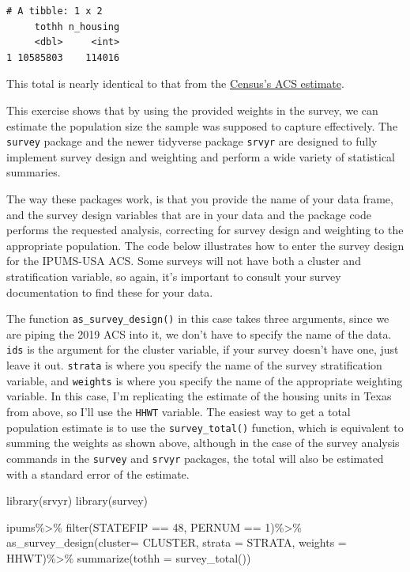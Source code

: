 \documentclass[
  letterpaper,
  DIV=11,
  numbers=noendperiod]{scrreprt}
\newenvironment{Shaded}{\begin{snugshade}}{\end{snugshade}}
\newcommand{\AttributeTok}[1]{\textcolor[rgb]{0.40,0.45,0.13}{#1}}
\newcommand{\DecValTok}[1]{\textcolor[rgb]{0.68,0.00,0.00}{#1}}
\newcommand{\FunctionTok}[1]{\textcolor[rgb]{0.28,0.35,0.67}{#1}}
\newcommand{\NormalTok}[1]{\textcolor[rgb]{0.00,0.23,0.31}{#1}}
\newcommand{\SpecialCharTok}[1]{\textcolor[rgb]{0.37,0.37,0.37}{#1}}
\begin{document}
\begin{verbatim}
# A tibble: 1 x 2
     tothh n_housing
     <dbl>     <int>
1 10585803    114016
\end{verbatim}

This total is nearly identical to that from the
\href{https://data.census.gov/cedsci/table?t=Housing\&g=0400000US48\&y=2019\&tid=ACSDP1Y2019.DP04}{Census's
ACS estimate}.

This exercise shows that by using the provided weights in the survey, we
can estimate the population size the sample was supposed to capture
effectively. The \texttt{survey} package and the newer tidyverse package
\texttt{srvyr} are designed to fully implement survey design and
weighting and perform a wide variety of statistical summaries.

The way these packages work, is that you provide the name of your data
frame, and the survey design variables that are in your data and the
package code performs the requested analysis, correcting for survey
design and weighting to the appropriate population. The code below
illustrates how to enter the survey design for the IPUMS-USA ACS. Some
surveys will not have both a cluster and stratification variable, so
again, it's important to consult your survey documentation to find these
for your data.

The function \texttt{as\_survey\_design()} in this case takes three
arguments, since we are piping the 2019 ACS into it, we don't have to
specify the name of the data. \texttt{ids} is the argument for the
cluster variable, if your survey doesn't have one, just leave it out.
\texttt{strata} is where you specify the name of the survey
stratification variable, and \texttt{weights} is where you specify the
name of the appropriate weighting variable. In this case, I'm
replicating the estimate of the housing units in Texas from above, so
I'll use the \texttt{HHWT} variable. The easiest way to get a total
population estimate is to use the \texttt{survey\_total()} function,
which is equivalent to summing the weights as shown above, although in
the case of the survey analysis commands in the \texttt{survey} and
\texttt{srvyr} packages, the total will also be estimated with a
standard error of the estimate.

\begin{Shaded}
\begin{Highlighting}[]
\FunctionTok{library}\NormalTok{(srvyr)}
\FunctionTok{library}\NormalTok{(survey)}

\NormalTok{ipums}\SpecialCharTok{\%\textgreater{}\%}
  \FunctionTok{filter}\NormalTok{(STATEFIP }\SpecialCharTok{==} \DecValTok{48}\NormalTok{, PERNUM }\SpecialCharTok{==} \DecValTok{1}\NormalTok{)}\SpecialCharTok{\%\textgreater{}\%}
  \FunctionTok{as\_survey\_design}\NormalTok{(}\AttributeTok{cluster=}\NormalTok{ CLUSTER,}
                   \AttributeTok{strata =}\NormalTok{ STRATA,}
                   \AttributeTok{weights =}\NormalTok{ HHWT)}\SpecialCharTok{\%\textgreater{}\%}
  \FunctionTok{summarize}\NormalTok{(}\AttributeTok{tothh =} \FunctionTok{survey\_total}\NormalTok{())}
\end{Highlighting}
\end{Shaded}
\end{document}
